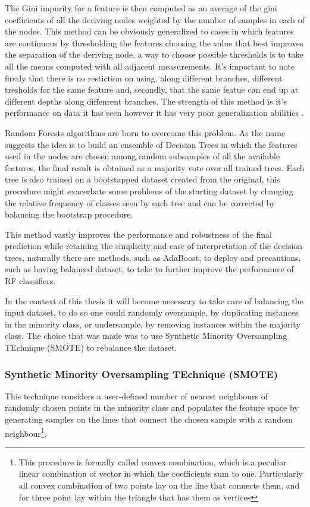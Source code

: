 The Gini impurity for a feature is then computed as an average of the gini coefficients of all the deriving nodes weighted by the number of samples in each of the nodes.  This method can be obviously generalized to cases in which features are continuous by thresholding the features choosing the value that best improves the separation of the deriving node, a way to choose possible thresholds is to take all the means computed with all adjacent measurements. It's important to note firstly that there is no restiction on using, along different branches, different tresholds for the same feature and, secondly, that the same featue can end up at different depths along diffenrent branches. The strength of this method is it's performance on data it has seen however it has very poor generalization abilities \cite{StatisticalLearning}. 

Random Forests algorithms are born to overcome this problem. As the name suggests the idea is to build an ensemble of Decision Trees in which the features used in the nodes are chosen among random subsamples of all the available features, the final result is obtained as a majority vote over all trained trees. Each tree is also trained on a bootstapped dataset created from the original, this procedure might exacerbate some problems of the starting dataset by changing the relative frequency of classes seen by each tree and can be corrected by balancing the bootstrap procedure.

This method vastly improves the performance and robustness of the final prediction while retaining the simplicity and ease of interpretation of the decision trees, naturally there are methods, such as AdaBoost, to deploy and precautions, such as having balanced dataset, to take to further improve the performance of RF classifiers.

In the context of this thesis it will become necessary to take care of balancing the input dataset, to do so one could randomly oversample, by duplicating instances in the minority class, or undersample, by removing instances within the majority class. The choice that was made was to use Synthetic Minority Oversampling TEchnique (SMOTE)\cite{SMOTE} to rebalance the dataset.

\subsubsection{Synthetic Minority Oversampling TEchnique (SMOTE)}
This technique considers a user-defined number of nearest neighbours of randomly chosen points in the minority class and populates the feature space by generating samples on the lines that connect the chosen sample with a random neighbour\footnote{This procedure is formally called convex combination, which is a peculiar linear combination of vector in which the coefficients sum to one. Particularly all convex combination of two points lay on the line that connects them, and for three point lay within the triangle that has them as vertices}.


